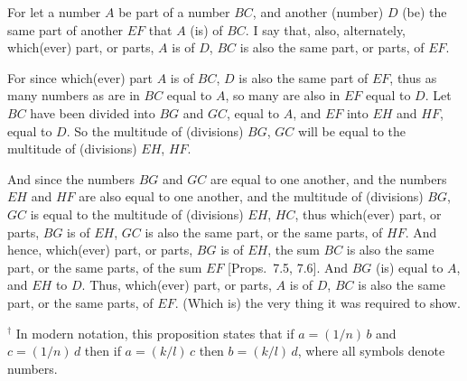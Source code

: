 \begin{Parallel}{}{}
{\epsfysize=2in
\centerline{}

For let a number $A$ be part of a number $BC$, and another (number) $D$ (be) the same
part of another $EF$ that $A$ (is) of $BC$. I say that, also, alternately, which(ever) part, or
parts, $A$ is of $D$, $BC$ is also the same part, or parts, of $EF$.

For since which(ever) part $A$ is of $BC$, $D$ is also the same part of $EF$, thus
as many numbers as are in $BC$ equal to $A$, so many are also in $EF$ equal to
$D$. Let $BC$ have been divided into $BG$ and $GC$, equal to $A$, and $EF$ into
$EH$ and $HF$, equal to $D$. So the multitude of (divisions) $BG$, $GC$ will be
equal to the multitude of (divisions) $EH$, $HF$.

And since the numbers $BG$ and $GC$ are equal to one another, and
the numbers $EH$ and $HF$ are also equal to one another, and the
multitude of (divisions) $BG$, $GC$ is equal to the multitude of (divisions)
$EH$, $HC$, thus which(ever) part, or parts, $BG$ is of $EH$, $GC$ is also
the same part, or the same parts, of $HF$. And hence, which(ever)
part, or parts, $BG$ is of $EH$, the sum $BC$ is also the same
part, or the same parts, of the sum $EF$ [Props.~7.5, 7.6]. And $BG$ (is) equal to $A$, and $EH$ to $D$.
 Thus, which(ever) part, or parts, $A$ is of $D$, $BC$ is also the same part, or
 the same parts, of $EF$. (Which is) the very thing it was required to show.}
\end{Parallel}
{\footnotesize\noindent$^\dag$ In modern notation, this
proposition states that if $a=(1/n)\,b$ and $c=(1/n)\,d$ then if $a=(k/l)\,c$
then $b = (k/l)\,d$, where all symbols denote numbers.}

